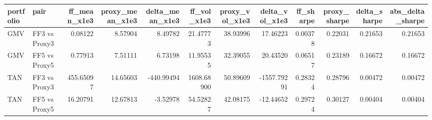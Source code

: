 \begin{tabular}{llrrrrrrrrrr}
\toprule
portfolio & pair & ff\_mean\_x1e3 & proxy\_mean\_x1e3 & delta\_mean\_x1e3 & ff\_vol\_x1e3 & proxy\_vol\_x1e3 & delta\_vol\_x1e3 & ff\_sharpe & proxy\_sharpe & delta\_sharpe & abs\_delta\_sharpe \\
\midrule
GMV & FF3 vs Proxy3 & 0.08122 & 8.57904 & 8.49782 & 21.47773 & 38.93996 & 17.46223 & 0.00378 & 0.22031 & 0.21653 & 0.21653 \\
GMV & FF5 vs Proxy5 & 0.77913 & 7.51111 & 6.73198 & 11.95535 & 32.39055 & 20.43520 & 0.06517 & 0.23189 & 0.16672 & 0.16672 \\
TAN & FF3 vs Proxy3 & 455.65097 & 14.65603 & -440.99494 & 1608.68900 & 50.89609 & -1557.79291 & 0.28324 & 0.28796 & 0.00472 & 0.00472 \\
TAN & FF5 vs Proxy5 & 16.20791 & 12.67813 & -3.52978 & 54.52827 & 42.08175 & -12.44652 & 0.29724 & 0.30127 & 0.00404 & 0.00404 \\
\bottomrule
\end{tabular}
